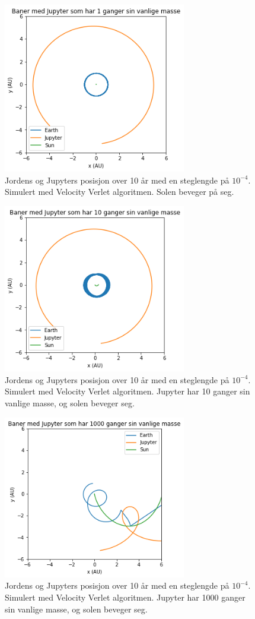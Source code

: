 \documentclass[reprint,english,notitlepage]{revtex4-1}
\begin{document}
	\begin{figure}[H]
		\includegraphics[width=80mm]{../Code/Figures/j1.png}
		\caption{Jordens og Jupyters posisjon over 10 år med en steglengde på $10^{-4}$. Simulert med Velocity Verlet algoritmen. Solen beveger på seg.}
		\label{fig:j1}
	\end{figure}

	\begin{figure}[H]
		\includegraphics[width=80mm]{../Code/Figures/j10.png}
		\caption{Jordens og Jupyters posisjon over 10 år med en steglengde på $10^{-4}$. Simulert med Velocity Verlet algoritmen. Jupyter har 10 ganger sin vanlige masse, og solen beveger seg.}
		\label{fig:j10}
	\end{figure}

	\begin{figure}[H]
		\includegraphics[width=80mm]{../Code/Figures/j1000.png}
		\caption{Jordens og Jupyters posisjon over 10 år med en steglengde på $10^{-4}$. Simulert med Velocity Verlet algoritmen. Jupyter har 1000 ganger sin vanlige masse, og solen beveger seg.}
		\label{fig:j1000}
	\end{figure}
\end{document}
